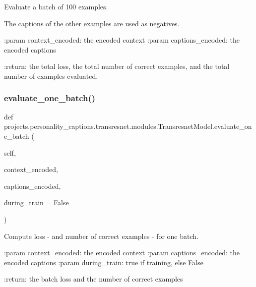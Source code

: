 \begin{DoxyVerb}Evaluate a batch of 100 examples.

The captions of the other examples are used as negatives.

:param context_encoded:
    the encoded context
:param captions_encoded:
    the encoded captions

:return:
    the total loss, the total number of correct examples, and the
    total number of examples evaluated.
\end{DoxyVerb}
 \mbox{\label{classprojects_1_1personality__captions_1_1transresnet_1_1modules_1_1TransresnetModel_aeabd7be189bc8127923aa8b424615110}} 
\subsubsection{\texorpdfstring{evaluate\+\_\+one\+\_\+batch()}{evaluate\_one\_batch()}}
{\footnotesize\ttfamily def projects.\+personality\+\_\+captions.\+transresnet.\+modules.\+Transresnet\+Model.\+evaluate\+\_\+one\+\_\+batch (\begin{DoxyParamCaption}\item[{}]{self,  }\item[{}]{context\+\_\+encoded,  }\item[{}]{captions\+\_\+encoded,  }\item[{}]{during\+\_\+train = {\ttfamily False} }\end{DoxyParamCaption})}

\begin{DoxyVerb}Compute loss - and number of correct examples - for one batch.

:param context_encoded:
    the encoded context
:param captions_encoded:
    the encoded captions
:param during_train:
    true if training, else False

:return:
    the batch loss and the number of correct examples
\end{DoxyVerb}
 \mbox{\label{classprojects_1_1personality__captions_1_1transresnet_1_1modules_1_1TransresnetModel_a1a0d7d70271cf1cb881f3166bfd7bf10}} 
